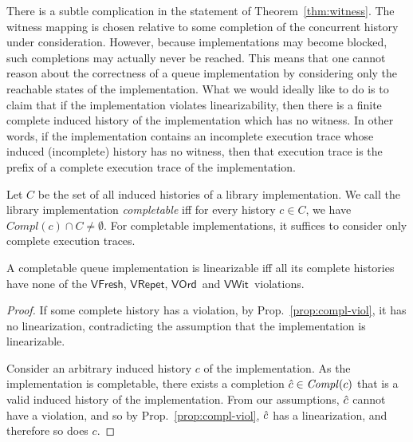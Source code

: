 \documentclass{LMCS}
\newcommand{\Compl}[1]{\ensuremath{\mathit{Compl}({#1})}}
\newcommand{\compl}{\ensuremath{\hat}}
\newcommand{\VFresh}{\ensuremath{\mathsf{VFresh}}}
\newcommand{\VRepet}{\ensuremath{\mathsf{VRepet}}}
\newcommand{\VOrd}{\ensuremath{\mathsf{VOrd}}}
\newcommand{\VWit}{\ensuremath{\mathsf{VWit}}}
\begin{document}
There is a subtle complication in the statement of Theorem~\ref{thm:witness}.
The witness mapping is chosen relative to some completion of the concurrent history under
consideration. 
However, because implementations may become blocked, such completions may actually never be reached. 
This means that one cannot reason about the correctness of a queue implementation by considering only the reachable states of the implementation.
What we would ideally like to do is to claim that if the implementation violates linearizability, then there is a finite complete induced history of the implementation which has no witness. 
In other words, if the implementation contains an incomplete execution trace whose induced (incomplete) history has no witness, then that execution trace is the prefix of a complete execution trace of the implementation.

Let $C$ be the set of all induced histories of a library implementation.
We call the library implementation \emph{completable} iff for every history $c
\in C$, we have $\Compl c \cap C \neq \emptyset$.
For completable implementations, it suffices to consider only complete execution traces.

\begin{thm}\label{thm:no-violations}
A completable queue implementation is linearizable 
iff all its complete histories have none of the \VFresh, \VRepet, \VOrd\ and \VWit\ violations.
\end{thm}

\begin{proof}\hfill

\noindent{\bf($\Rightarrow$)} If some complete history has a violation, by Prop.~\ref{prop:compl-viol}, it has no linearization, contradicting the assumption that the implementation is linearizable.

\noindent{\bf($\Leftarrow$)}
Consider an arbitrary induced history $c$ of the implementation. 
As the implementation is completable, 
there exists a completion $\compl c \in \Compl c$ that is a valid induced history of the implementation.
From our assumptions, $\compl c$ cannot have a violation, and so by
Prop.~\ref{prop:compl-viol}, $\compl c$ has a linearization, and therefore so does $c$.
\end{proof}
\end{document}
